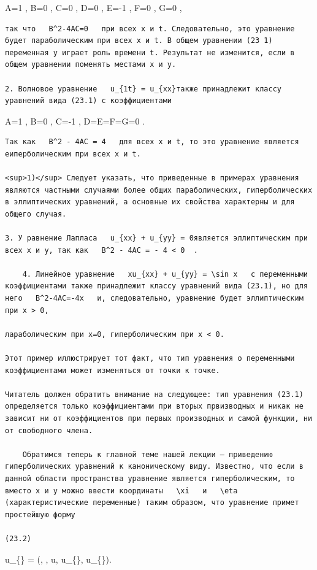 \documentclass[
  ukrainian,
]{article}
\begin{document}
A=1 , B=0 , C=0 , D=0 , E=-1 , F=0 , G=0 ,

\begin{verbatim}
так что   B^2-4AC=0   при всех x и t. Следовательно, это уравнение будет параболическим при всех x и t. В общем уравнении (23 1) переменная y играет роль времени t. Результат не изменится, если в общем уравнении поменять местами x и y.

2. Волновое уравнение   u_{1t} = u_{xx}также принадлежит классу уравнений вида (23.1) с коэффициентами
\end{verbatim}

A=1 , B=0 , C=-1 , D=E=F=G=0 .

\begin{verbatim}
Так как   B^2 - 4AC = 4   для всех x и t, то это уравнение является еиперболическим при всех x и t.

<sup>1)</sup> Следует указать, что приведенные в примерах уравнения являются частными случаями более общих параболических, гиперболических в эллиптических уравнений, а основные их свойства характерны и для общего случая.

3. У равнение Лапласа   u_{xx} + u_{yy} = 0является эллиптическим при всех x и y, так как   B^2 - 4AC = - 4 < 0  .

    4. Линейное уравнение   xu_{xx} + u_{yy} = \sin x   с переменными коэффициентами также принадлежит классу уравнений вида (23.1), но для него   B^2-4AC=-4x   и, следовательно, уравнение будет эллиптическим при x > 0,

лараболическим при x=0, гиперболическим при x < 0.

Этот пример иллюстрирует тот факт, что тип уравнения о переменными коэффициентами может изменяться от точки к точке.

Читатель должен обратить внимание на следующее: тип уравнения (23.1) определяется только коэффициентами при вторых првизводных и никак не зависит ни от коэффициентов при первых производных и самой функции, ни от свободного члена.

    Обратимся теперь к главной теме нашей лекции — приведению гиперболических уравнений к каноническому виду. Известно, что если в данной области пространства уравнение является гиперболическим, то вместо x и y можно ввести координаты   \xi   и   \eta  (характеристические переменные) таким образом, что уравнение примет простейшую форму

(23.2)
\end{verbatim}

u\_\{\xi\eta\} = \Phi(\xi, \eta, u, u\_\{\xi\}, u\_\{\eta\}).
\end{document}
